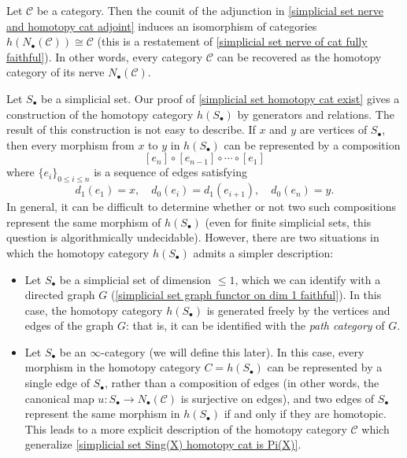 \begin{remark}
Let $\mathcal{C}$ be a category. Then the counit of the adjunction in \cref{simplicial set nerve and homotopy cat adjoint} induces an isomorphism of categories $h(N_\bullet(\mathcal{C}))\cong\mathcal{C}$ (this is a restatement of \cref{simplicial set nerve of cat fully faithful}). In other words, every category $\mathcal{C}$ can be recovered as the homotopy category of its nerve $N_\bullet(\mathcal{C})$.
\end{remark}
\begin{remark}
Let $S_\bullet$ be a simplicial set. Our proof of \cref{simplicial set homotopy cat exist} gives a construction of the homotopy category $h(S_\bullet)$ by generators and relations. The result of this construction is not easy to describe. If $x$ and $y$ are vertices of $S_\bullet$, then every morphism from $x$ to $y$ in $h(S_\bullet)$ can be represented by a composition
\[[e_n]\circ[e_{n-1}]\circ\cdots\circ[e_1]\]
where $\{e_i\}_{0\leq i\leq n}$ is a sequence of edges satisfying
\[d_1(e_1)=x,\quad d_0(e_i)=d_1(e_{i+1}),\quad d_0(e_n)=y.\]
In general, it can be difficult to determine whether or not two such compositions represent the same morphism of $h(S_\bullet)$ (even for finite simplicial sets, this question is algorithmically undecidable). However, there are two situations in which the homotopy category $h(S_\bullet)$ admits a simpler description:
\begin{itemize}
\item Let $S_\bullet$ be a simplicial set of dimension $\leq 1$, which we can identify with a directed graph $G$ (\cref{simplicial set graph functor on dim 1 faithful}). In this case, the homotopy category $h(S_\bullet)$ is generated freely by the vertices and edges of the graph $G$: that is, it can be identified with the \textit{path category} of $G$.
\item Let $S_\bullet$ be an $\infty$-category (we will define this later). In this case, every morphism in the homotopy category $C=h(S_\bullet)$ can be represented by a single edge of $S_\bullet$, rather than a composition of edges (in other words, the canonical map $u:S_\bullet\to N_\bullet(\mathcal{C})$ is surjective on edges), and two edges of $S_\bullet$ represent the same morphism in $h(S_\bullet)$ if and only if they are homotopic. This leads to a more explicit description of the homotopy category $\mathcal{C}$ which generalize \cref{simplicial set Sing(X) homotopy cat is Pi(X)}.
\end{itemize}
\end{remark}
